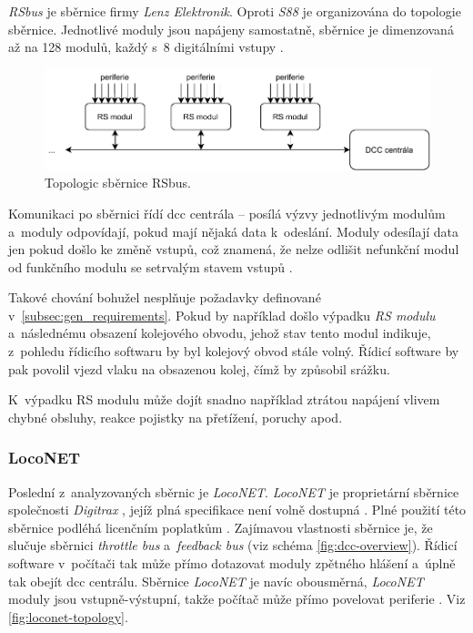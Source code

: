 \textit{RSbus} je sběrnice firmy \textit{Lenz Elektronik}. Oproti \textit{S88}
je organizována do topologie sběrnice. Jednotlivé moduly jsou napájeny
samostatně, sběrnice je dimenzovaná až na 128 modulů, každý s~8 digitálními
vstupy \cite{rs:web} \cite{rs_lib:web}.

\begin{figure}[ht!]
\includegraphics[width=\textwidth]{data/rs.pdf}
\caption{Topologic sběrnice RSbus.}
\label{fig:rs-topology}
\end{figure}

Komunikaci po sběrnici řídí \gls{dcc} centrála – posílá výzvy jednotlivým
modulům a~moduly odpovídají, pokud mají nějaká data k~odeslání. Moduly odesílají
data jen pokud došlo ke změně vstupů, což znamená, že nelze odlišit nefunkční
modul od funkčního modulu se setrvalým stavem vstupů \cite{rs_lib:web}.

Takové chování bohužel nesplňuje požadavky definované
v~\ref{subsec:gen_requirements}. Pokud by například došlo výpadku \textit{RS
modulu} a~následnému obsazení kolejového obvodu, jehož stav tento modul indikuje,
z~pohledu řídicího softwaru by byl kolejový obvod stále volný. Řídicí software
by pak povolil vjezd vlaku na obsazenou kolej, čímž by způsobil srážku.

K~výpadku RS modulu může dojít snadno například ztrátou napájení vlivem chybné
obsluhy, reakce pojistky na přetížení, poruchy apod.

\subsubsection{LocoNET}

Poslední z~analyzovaných sběrnic je \textit{LocoNET}. \textit{LocoNET} je
proprietární sběrnice společnosti \textit{Digitrax} \cite{loconet:web}, jejíž
plná specifikace není volně dostupná \cite{loconet_license:web}.  Plné použití
této sběrnice podléhá licenčním poplatkům \cite{loconet_license:web}.
Zajímavou vlastnosti sběrnice je, že slučuje sběrnici \textit{throttle bus}
a~\textit{feedback bus} (viz schéma \ref{fig:dcc-overview}). Řídicí software
v~počítači tak může přímo dotazovat moduly zpětného hlášení a~úplně tak obejít
\gls{dcc} centrálu. Sběrnice \textit{LocoNET} je navíc obousměrná,
\textit{LocoNET} moduly jsou vstupně-výstupní, takže počítač může přímo
povelovat periferie \cite{loconet:web}. Viz \ref{fig:loconet-topology}.

